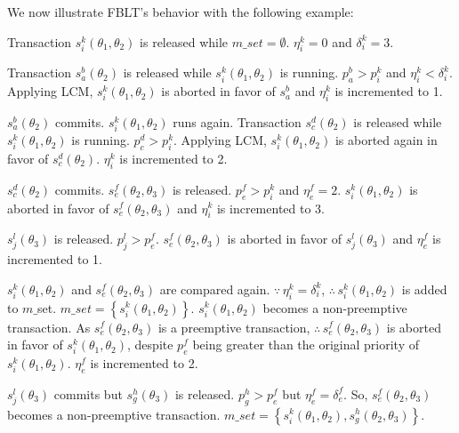 \documentclass[prodmode,acmtecs]{acmsmall}
\begin{document}
We now illustrate FBLT's behavior with the following example:
\begin{compactenum}
\item Transaction $s_{i}^{k}(\theta_{1},\theta_{2})$ is released while
$m\_set=\emptyset$. $\eta_{i}^{k}=0$ and $\delta_{i}^{k}=3$.
\item \label{fblt_ex_step 2} Transaction $s_{a}^{b}(\theta_{2})$ is released
while $s_{i}^{k}(\theta_{1},\theta_{2})$ is running. $p_{a}^{b}>p_{i}^{k}$
and $\eta_{i}^{k}<\delta_{i}^{k}$. Applying LCM, $s_{i}^{k}(\theta_{1},\theta_{2})$
is aborted in favor of $s_{a}^{b}$ and $\eta_{i}^{k}$ is incremented
to 1.
\item $s_{a}^{b}(\theta_{2})$ commits. $s_{i}^{k}(\theta_{1},\theta_{2})$
runs again. Transaction $s_{c}^{d}(\theta_{2})$ is released while
$s_{i}^{k}(\theta_{1},\theta_{2})$ is running. $p_{c}^{d}>p_{i}^{k}$. Applying LCM, $s_{i}^{k}(\theta_{1},\theta_{2})$ is aborted again in favor of $s_{c}^{d}(\theta_{2})$.
$\eta_{i}^{k}$ is incremented to 2.
\item $s_{c}^{d}(\theta_{2})$ commits. $s_{e}^{f}(\theta_{2},\theta_{3})$
is released. $p_{e}^{f}>p_{i}^{k}$ and $\eta_{e}^{f}=2$. $s_{i}^{k}(\theta_{1},\theta_{2})$
is aborted in favor of $s_{e}^{f}(\theta_{2},\theta_{3})$ and $\eta_{i}^{k}$
is incremented to 3.
\item $s_{j}^{l}(\theta_{3})$ is released. $p_{j}^{l}>p_{e}^{f}$. $s_{e}^{f}(\theta_{2},\theta_{3})$ is aborted in favor of $s_{j}^{l}(\theta_{3})$
and $\eta_{e}^{f}$ is incremented to 1.
\item \label{fblt_ex_step 6} $s_{i}^{k}(\theta_{1},\theta_{2})$ and $s_{e}^{f}(\theta_{2},\theta_{3})$
are compared again. $\because\,\eta_{i}^{k}=\delta_{i}^{k}$, $\therefore\, s_{i}^{k}(\theta_{1},\theta_{2})$
is added to $m\_$set. $m\_set=\left\{ s_{i}^{k}(\theta_{1},\theta_{2})\right\} $.
$s_{i}^{k}(\theta_{1},\theta_{2})$ becomes a non-preemptive transaction.
As $s_{e}^{f}(\theta_{2},\theta_{3})$ is a preemptive transaction, $\therefore\, s_{e}^{f}(\theta_{2},\theta_{3})$ is aborted in
favor of $s_{i}^{k}(\theta_{1},\theta_{2})$, despite $p_{e}^{f}$ being greater than the original priority of $s_i^k(\theta_1,\theta_2)$. $\eta_{e}^{f}$ is incremented to 2.
%
\item \label{fblt_ex_step 7} $s_{j}^{l}(\theta_{3})$ commits but $s_{g}^{h}(\theta_{3})$
is released. $p_{g}^{h}>p_{e}^{f}$ but $\eta_{e}^{f}=\delta_{e}^{f}$.
So, $s_{e}^{f}(\theta_{2},\theta_{3})$ becomes a non-preemptive transaction.
$m\_set=\left\{ s_{i}^{k}(\theta_{1},\theta_{2}),s_{g}^{h}(\theta_{2},\theta_{3})\right\} $.

\end{compactenum}
\end{document}

